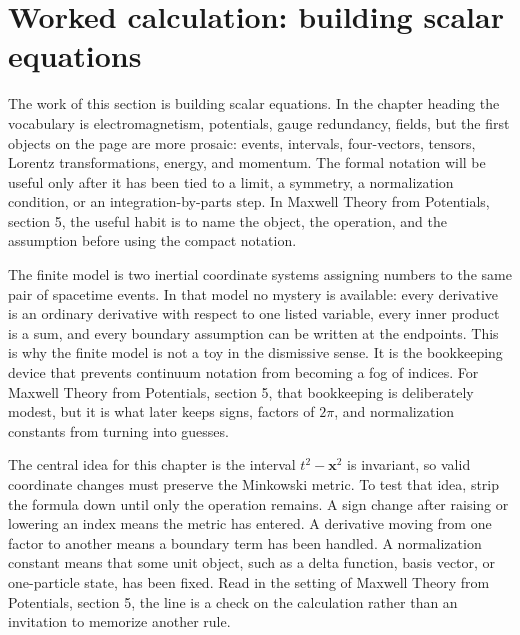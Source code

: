 \section{Worked calculation: building scalar equations}













The work of this section is building scalar equations.  In the chapter heading the vocabulary is electromagnetism, potentials, gauge redundancy, fields, but the first objects on the page are more prosaic: events, intervals, four-vectors, tensors, Lorentz transformations, energy, and momentum.  The formal notation will be useful only after it has been tied to a limit, a symmetry, a normalization condition, or an integration-by-parts step.  In Maxwell Theory from Potentials, section 5, the useful habit is to name the object, the operation, and the assumption before using the compact notation.

The finite model is two inertial coordinate systems assigning numbers to the same pair of spacetime events.  In that model no mystery is available: every derivative is an ordinary derivative with respect to one listed variable, every inner product is a sum, and every boundary assumption can be written at the endpoints.  This is why the finite model is not a toy in the dismissive sense.  It is the bookkeeping device that prevents continuum notation from becoming a fog of indices.  For Maxwell Theory from Potentials, section 5, that bookkeeping is deliberately modest, but it is what later keeps signs, factors of \(2\pi\), and normalization constants from turning into guesses.

The central idea for this chapter is the interval \(t^2-\bm x^2\) is invariant, so valid coordinate changes must preserve the Minkowski metric.  To test that idea, strip the formula down until only the operation remains.  A sign change after raising or lowering an index means the metric has entered.  A derivative moving from one factor to another means a boundary term has been handled.  A normalization constant means that some unit object, such as a delta function, basis vector, or one-particle state, has been fixed.  Read in the setting of Maxwell Theory from Potentials, section 5, the line is a check on the calculation rather than an invitation to memorize another rule.

